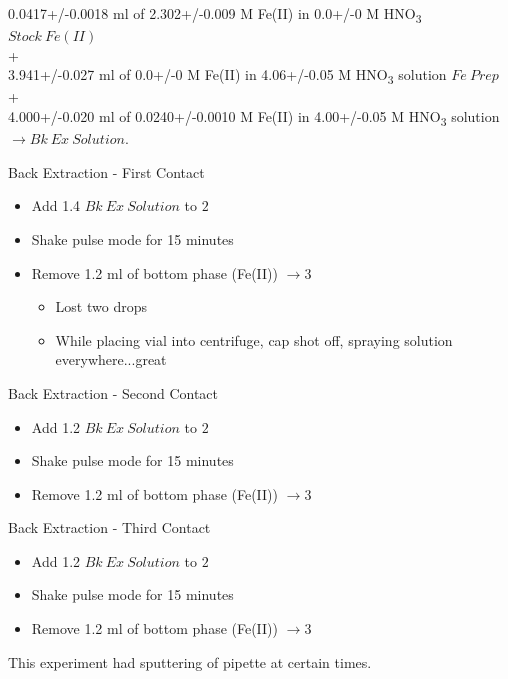 \documentclass[idxtotoc,hyperref,openany,oneside]{labbook} %
\newcommand{\cmark}{\ding{51}}%
\newcommand{\done}{\rlap{$\square$}{\raisebox{2pt}{\large\hspace{1pt}\cmark}}%
  \hspace{-2.5pt}}
\newcommand{\tsbs}{\textsubscript}
\begin{document}
\begin{center}
0.0417+/-0.0018 ml of 2.302+/-0.009 M Fe(II) in 0.0+/-0 M HNO\tsbs{3} $\boxed{Stock\ Fe(II)}$\\
+\\
3.941+/-0.027 ml of 0.0+/-0 M Fe(II) in 4.06+/-0.05 M HNO\tsbs{3} solution $\boxed{Fe\ Prep}$\\
+\\
4.000+/-0.020 ml of 0.0240+/-0.0010 M Fe(II) in 4.00+/-0.05 M HNO\tsbs{3} solution $\boxed{\rightarrow Bk\ Ex\ Solution}$.
\end{center}
\begin{todolist}
\item[\done]{Back Extraction - First Contact}
  \begin{itemize}
  \item{Add 1.4 $\boxed{Bk\ Ex\ Solution}$ to $\boxed{2}$}
  \item{Shake pulse mode for 15 minutes}
  \item{Remove 1.2 ml of bottom phase (Fe(II)) $\boxed{\rightarrow 3}$}
    \begin{itemize}
    \item{Lost two drops}
    \item{While placing vial into centrifuge, cap shot off,
      spraying solution everywhere...great}
    \end{itemize}
  \end{itemize}
\item[\done]{Back Extraction - Second Contact}
  \begin{itemize}
  \item{Add 1.2 $\boxed{Bk\ Ex\ Solution}$ to $\boxed{2}$}
  \item{Shake pulse mode for 15 minutes}
  \item{Remove 1.2 ml of bottom phase (Fe(II)) $\boxed{\rightarrow 3}$}
  \end{itemize}
\item[\done]{Back Extraction - Third Contact}
  \begin{itemize}
  \item{Add 1.2 $\boxed{Bk\ Ex\ Solution}$ to $\boxed{2}$}
  \item{Shake pulse mode for 15 minutes}
  \item{Remove 1.2 ml of bottom phase (Fe(II)) $\boxed{\rightarrow 3}$}
  \end{itemize}
\end{todolist}
\vspace{5mm}
This experiment had sputtering of pipette at certain times.
\end{document}

